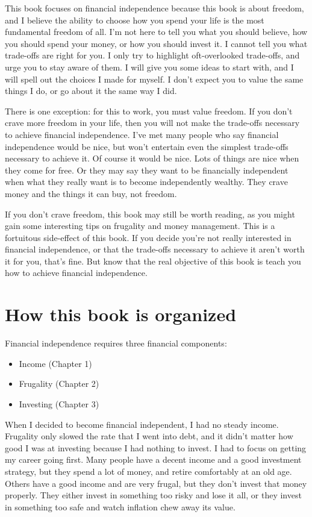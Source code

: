 This book focuses on financial independence because this book is about freedom, and I believe the ability to choose how you spend your life is the most fundamental freedom of all. I'm not here to tell you what you should believe, how you should spend your money, or how you should invest it. I cannot tell you what trade-offs are right for you. I only try to highlight oft-overlooked trade-offs, and urge you to stay aware of them. I will give you some ideas to start with, and I will spell out the choices I made for myself. I don't expect you to value the same things I do, or go about it the same way I did.

There is one exception: for this to work, you must value freedom. If you don't crave more freedom in your life, then you will not make the trade-offs necessary to achieve financial independence. I've met many people who say financial independence would be nice, but won't entertain even the simplest trade-offs necessary to achieve it. Of course it would be nice. Lots of things are nice when they come for free. Or they may say they want to be financially independent when what they really want is to become independently wealthy. They crave money and the things it can buy, not freedom.

If you don't crave freedom, this book may still be worth reading, as you might gain some interesting tips on frugality and money management. This is a fortuitous side-effect of this book. If you decide you're not really interested in financial independence, or that the trade-offs necessary to achieve it aren't worth it for you, that's fine. But know that the real objective of this book is teach you how to achieve financial independence.

\section{How this book is organized}
Financial independence requires three financial components:
\begin{itemize}
\item Income (Chapter 1)
\item Frugality (Chapter 2)
\item Investing (Chapter 3)
\end{itemize}

When I decided to become financial independent, I had no steady income. Frugality only slowed the rate that I went into debt, and it didn't matter how good I was at investing because I had nothing to invest. I had to focus on getting my career going first. Many people have a decent income and a good investment strategy, but they spend a lot of money, and retire comfortably at an old age. Others have a good income and are very frugal, but they don't invest that money properly. They either invest in something too risky and lose it all, or they invest in something too safe and watch inflation chew away its value.

